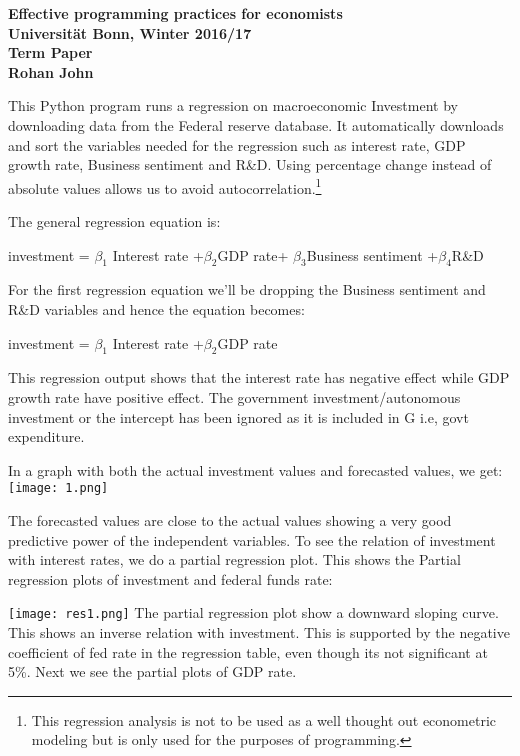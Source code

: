 \documentclass[12pt,a4paper,leqno]{report}
\theoremstyle{definition}
\begin{document}
	
	\begin{center}
		\begin{large}
			\textbf{
				Effective programming practices for economists\\
				Universität Bonn, Winter 2016/17 \\[2ex]
				Term Paper\\[2ex]
				Rohan John
			}
		\end{large}
	\end{center}

This Python program runs a regression on macroeconomic Investment by downloading data from the Federal reserve database. It automatically downloads and sort the variables needed for the regression such as interest rate, GDP growth rate, Business sentiment and R\&D. Using percentage change instead of absolute values allows us to avoid autocorrelation.\footnote{This regression analysis is not to be used as a well thought out econometric modeling but is only used for the purposes of programming.}

The general regression equation is: 
\begin{center}
	investment = $\beta_{1}$ Interest rate +$\beta_{2}$GDP rate+ $\beta_{3}$Business sentiment +$\beta_{4}$R\&D
\end{center}

For the first regression equation we'll be dropping the Business sentiment and R\&D variables and hence the equation becomes: 
\begin{center}
	investment = $\beta_{1}$ Interest rate +$\beta_{2}$GDP rate
\end{center}


This regression output shows that the interest rate has negative effect while GDP growth rate have positive effect. The government investment/autonomous investment or the intercept has been ignored as it is included in G i.e, govt expenditure. 

In a graph with both the actual investment values and forecasted values, we get:\newline
\texttt{[image: 1.png]} 

The forecasted values are close to the actual values showing a very good predictive power of the independent variables. To see the relation of investment with interest rates, we do a partial regression plot.
This shows the Partial regression plots of investment and federal funds rate:

\texttt{[image: res1.png]}
The partial regression plot show a downward sloping curve. This shows an inverse relation with investment. This is supported by the negative coefficient of fed rate in the regression table, even though its not significant at 5\%. Next we see the partial plots of GDP rate.
\end{document}
